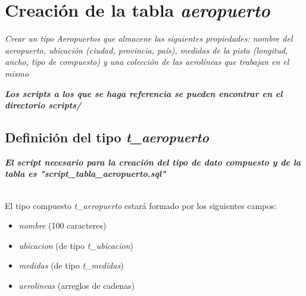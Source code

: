 







\clearpage
\tableofcontents
\clearpage


\section{Creación de la tabla \emph{aeropuerto}}

\emph{Crear un tipo Aeropuertos que almacene las siguientes propiedades: nombre del aeropuerto, ubicación (ciudad, provincia, país), medidas de la pista (longitud, ancho, tipo de compuesto) y una colección de las aerolíneas que trabajan en el mismo} 

\emph{\textbf{Los scripts a los que se haga referencia se pueden encontrar en el directorio scripts/}} 

\subsection{Definición del tipo \emph{t\_aeropuerto}}

\emph{\textbf{El script necesario para la creación del tipo de dato compuesto y de la tabla es "script\_tabla\_aeropuerto.sql"}} 

~\\

El tipo compuesto \emph{t\_aeropuerto} estará formado por los siguientes campos:
\begin{itemize}
    \item \emph{nombre} (100 caracteres) 
    \item \emph{ubicacion} (de tipo \emph{t\_ubicacion}) 
    \item \emph{medidas} (de tipo \emph{t\_medidas}) 
    \item \emph{aerolineas} (arreglos de cadenas) 
\end{itemize}

